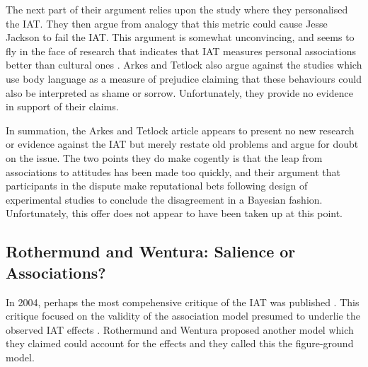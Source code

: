 The next part of their argument relies upon the \cite{Olson2004} study where they personalised the IAT. They then argue from analogy that this metric could cause Jesse Jackson to fail the IAT. This argument is somewhat unconvincing, and seems to fly in the face of research that indicates that IAT measures personal associations better than cultural ones \cite{Nosek2008a}. Arkes and Tetlock also argue against the studies which use body language as a measure of prejudice  claiming that these behaviours could also be interpreted as shame or sorrow. Unfortunately, they provide no evidence in support of their claims. 


In summation, the Arkes and Tetlock article appears to present no new research or evidence against the IAT but merely restate old problems and argue for doubt on the issue. The two points they do make cogently is that the leap from associations to attitudes has been made too quickly, and their argument that participants in the dispute make reputational bets following design of experimental studies to conclude the disagreement in a Bayesian fashion. Unfortunately, this offer does not appear to have been taken up at this point. 

\subsection{Rothermund and Wentura: Salience or Associations?}

In 2004, perhaps the most compehensive critique of the IAT was published \cite{Rothermund2004}. This critique focused on the validity of the association model presumed to underlie the observed IAT effects \cite{Greenwald1998}. Rothermund and Wentura proposed another model which they claimed could account for the effects and they called this the figure-ground model. 

